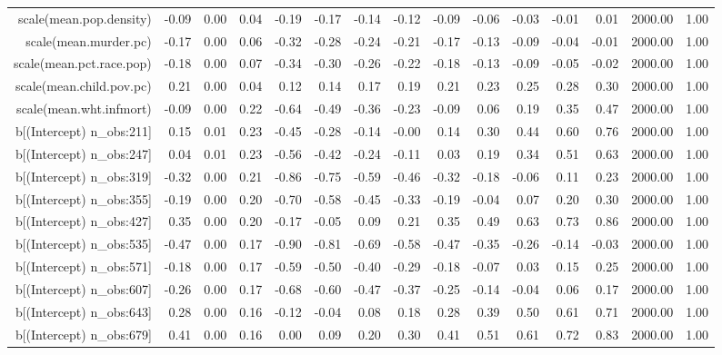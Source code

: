 \begin{table}[ht]
\begin{tabular}{rrrrrrrrrrrrrrr}
  scale(mean.pop.density) & -0.09 & 0.00 & 0.04 & -0.19 & -0.17 & -0.14 & -0.12 & -0.09 & -0.06 & -0.03 & -0.01 & 0.01 & 2000.00 & 1.00 \\ 
  scale(mean.murder.pc) & -0.17 & 0.00 & 0.06 & -0.32 & -0.28 & -0.24 & -0.21 & -0.17 & -0.13 & -0.09 & -0.04 & -0.01 & 2000.00 & 1.00 \\ 
  scale(mean.pct.race.pop) & -0.18 & 0.00 & 0.07 & -0.34 & -0.30 & -0.26 & -0.22 & -0.18 & -0.13 & -0.09 & -0.05 & -0.02 & 2000.00 & 1.00 \\ 
  scale(mean.child.pov.pc) & 0.21 & 0.00 & 0.04 & 0.12 & 0.14 & 0.17 & 0.19 & 0.21 & 0.23 & 0.25 & 0.28 & 0.30 & 2000.00 & 1.00 \\ 
  scale(mean.wht.infmort) & -0.09 & 0.00 & 0.22 & -0.64 & -0.49 & -0.36 & -0.23 & -0.09 & 0.06 & 0.19 & 0.35 & 0.47 & 2000.00 & 1.00 \\ 
  b[(Intercept) n\_obs:211] & 0.15 & 0.01 & 0.23 & -0.45 & -0.28 & -0.14 & -0.00 & 0.14 & 0.30 & 0.44 & 0.60 & 0.76 & 2000.00 & 1.00 \\ 
  b[(Intercept) n\_obs:247] & 0.04 & 0.01 & 0.23 & -0.56 & -0.42 & -0.24 & -0.11 & 0.03 & 0.19 & 0.34 & 0.51 & 0.63 & 2000.00 & 1.00 \\ 
  b[(Intercept) n\_obs:319] & -0.32 & 0.00 & 0.21 & -0.86 & -0.75 & -0.59 & -0.46 & -0.32 & -0.18 & -0.06 & 0.11 & 0.23 & 2000.00 & 1.00 \\ 
  b[(Intercept) n\_obs:355] & -0.19 & 0.00 & 0.20 & -0.70 & -0.58 & -0.45 & -0.33 & -0.19 & -0.04 & 0.07 & 0.20 & 0.30 & 2000.00 & 1.00 \\ 
  b[(Intercept) n\_obs:427] & 0.35 & 0.00 & 0.20 & -0.17 & -0.05 & 0.09 & 0.21 & 0.35 & 0.49 & 0.63 & 0.73 & 0.86 & 2000.00 & 1.00 \\ 
  b[(Intercept) n\_obs:535] & -0.47 & 0.00 & 0.17 & -0.90 & -0.81 & -0.69 & -0.58 & -0.47 & -0.35 & -0.26 & -0.14 & -0.03 & 2000.00 & 1.00 \\ 
  b[(Intercept) n\_obs:571] & -0.18 & 0.00 & 0.17 & -0.59 & -0.50 & -0.40 & -0.29 & -0.18 & -0.07 & 0.03 & 0.15 & 0.25 & 2000.00 & 1.00 \\ 
  b[(Intercept) n\_obs:607] & -0.26 & 0.00 & 0.17 & -0.68 & -0.60 & -0.47 & -0.37 & -0.25 & -0.14 & -0.04 & 0.06 & 0.17 & 2000.00 & 1.00 \\ 
  b[(Intercept) n\_obs:643] & 0.28 & 0.00 & 0.16 & -0.12 & -0.04 & 0.08 & 0.18 & 0.28 & 0.39 & 0.50 & 0.61 & 0.71 & 2000.00 & 1.00 \\ 
  b[(Intercept) n\_obs:679] & 0.41 & 0.00 & 0.16 & 0.00 & 0.09 & 0.20 & 0.30 & 0.41 & 0.51 & 0.61 & 0.72 & 0.83 & 2000.00 & 1.00 \\ 

\end{tabular}
\end{table}
